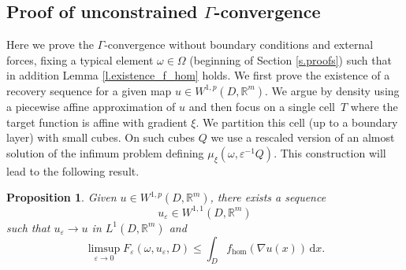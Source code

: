 \documentclass[JEP,XML,SOM,Unicode,published]{cedram}
\newtheorem{proposition}[theorem]{Proposition}
\theoremstyle{definition}
\let\e\varepsilon
\let\w\omega
\newcommand{\R}{\mathbb{R}}
\begin{document}
\subsection{Proof of unconstrained \texorpdfstring{$\Gamma$}{}-convergence}
Here we prove the $\Gamma$-convergence without boundary conditions and external forces, fixing a typical element $\w\in\Omega$ (\cf beginning of Section \ref{s.proofs}) such that in addition Lemma \ref{l.existence_f_hom} holds. We first prove the existence of a recovery sequence for a given map $u\in W^{1,p}(D,\R^m)$. We argue by density using a piecewise affine approximation of $u$ and then focus on a single cell~$T$ where the target function is affine with gradient $\xi$. We partition this cell (up to a boundary layer) with small cubes. On such cubes $Q$ we use a rescaled version of an almost solution of the infimum problem defining $\mu_{\xi}(\w,\e^{-1}Q)$. This construction will lead to the following result.
\begin{proposition}\label{p.ub}
Given $u\in W^{1,p}(D,\R^m)$, there exists a sequence
\[
u_{\e}\in W^{1,1}(D,\R^m)
\]
such that $u_{\e}\to u$ in $L^1(D,\R^m)$ and
\begin{equation*}
\limsup_{\e\to 0}F_{\e}(\w,u_{\e},D)\leq \int_D f_{\hom}(\nabla u(x))\,\mathrm{d}x.
\end{equation*}
\end{proposition}
\end{document}
